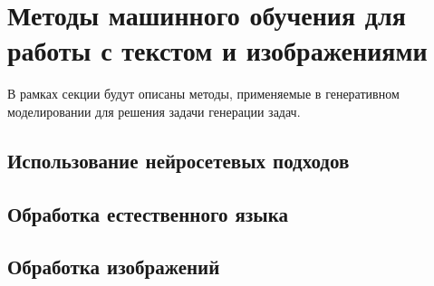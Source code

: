 \chapter{Методы машинного обучения для работы с текстом и изображениями}
В рамках секции будут описаны методы, применяемые в генеративном моделировании
для решения задачи генерации задач.

\section{Использование нейросетевых подходов}



\section{Обработка естественного языка}




\section{Обработка изображений}





